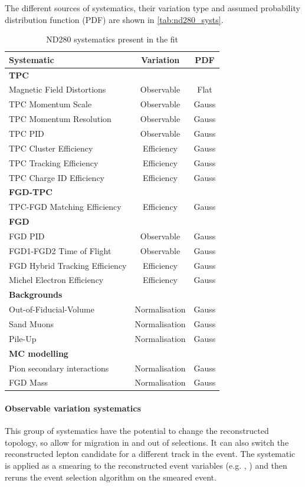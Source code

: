 The different sources of systematics, their variation type and assumed probability distribution function (PDF) are shown in \autoref{tab:nd280_systs}.
\begin{table}[h]
	\begin{tabular}{l | c c}
	\hline
	\hline
	Systematic						& Variation 	& PDF \\
	\hline
	\multicolumn{3}{l}{\textbf{TPC}} \\
	Magnetic Field Distortions		& Observable 	& Flat \\
	TPC Momentum Scale				& Observable	& Gauss \\
	TPC Momentum Resolution			& Observable	& Gauss \\
	TPC PID							& Observable	& Gauss \\
	TPC Cluster Efficiency			& Efficiency	& Gauss \\
	TPC Tracking Efficiency			& Efficiency	& Gauss \\
	TPC Charge ID Efficiency		& Efficiency	& Gauss \\
	\hline 
	\multicolumn{3}{l}{\textbf{FGD-TPC}} \\
	TPC-FGD Matching Efficiency		& Efficiency	& Gauss \\
	\hline
	\multicolumn{3}{l}{\textbf{FGD}} \\
	FGD PID							& Observable	& Gauss \\
	FGD1-FGD2 Time of Flight		& Observable	& Gauss \\
	FGD Hybrid Tracking Efficiency	& Efficiency	& Gauss \\
	Michel Electron Efficiency		& Efficiency	& Gauss \\
	\hline
	\multicolumn{3}{l}{\textbf{Backgrounds}} \\
	Out-of-Fiducial-Volume			& Normalisation & Gauss \\
	Sand Muons						& Normalisation & Gauss \\
	Pile-Up							& Normalisation	& Gauss \\
	\hline
	\multicolumn{3}{l}{\textbf{MC modelling}} \\
	Pion secondary interactions		& Normalisation & Gauss \\
	FGD Mass						& Normalisation & Gauss \\
	\hline
	\hline
	\end{tabular}
\caption{ND280 systematics present in the fit}
\label{tab:nd280_systs}
\end{table}

\paragraph{Observable variation systematics}
This group of systematics have the potential to change the reconstructed topology, so allow for migration in and out of selections. It can also switch the reconstructed lepton candidate for a different track in the event. The systematic is applied as a smearing to the reconstructed event variables (e.g. \pmu, \cosmu) and then reruns the event selection algorithm on the smeared event.

